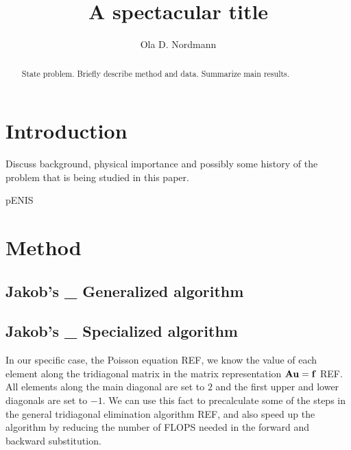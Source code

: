 \documentclass{emulateapj}
\begin{document}
\title{A spectacular title}

\author{Ola D. Nordmann}





\begin{abstract}
  State problem. Briefly describe method and data. Summarize main results.
\end{abstract}

\section{Introduction}
\label{sec:introduction}

Discuss background, physical importance and possibly some history of
the problem that is being studied in this paper.

pENIS


\section{Method}
\label{sec:method}

\subsection*{Jakob's \_ Generalized algorithm}

\subsection*{Jakob's \_ Specialized algorithm}
In our specific case, the Poisson equation REF, we know the value of each element along the tridiagonal matrix in the matrix representation $\vb{A}\vb{u} = \vb{f}$ REF. All elements along the main diagonal are set to $2$ and the first upper and lower diagonals are set to $-1$. We can use this fact to precalculate some of the steps in the general tridiagonal elimination algorithm REF, and also speed up the algorithm by reducing the number of FLOPS needed in the forward and backward substitution.
\end{document}
